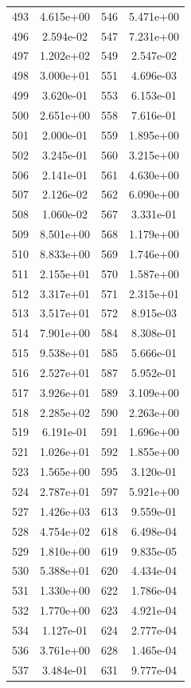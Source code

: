 \documentclass[12pt]{article}
\begin{document}
\begin{longtable}{@{}cccc@{}}
493 & 4.615e+00 & 546 & 5.471e+00 \\
496 & 2.594e-02 & 547 & 7.231e+00 \\
497 & 1.202e+02 & 549 & 2.547e-02 \\
498 & 3.000e+01 & 551 & 4.696e-03 \\
499 & 3.620e-01 & 553 & 6.153e-01 \\
500 & 2.651e+00 & 558 & 7.616e-01 \\
501 & 2.000e-01 & 559 & 1.895e+00 \\
502 & 3.245e-01 & 560 & 3.215e+00 \\
506 & 2.141e-01 & 561 & 4.630e+00 \\
507 & 2.126e-02 & 562 & 6.090e+00 \\
508 & 1.060e-02 & 567 & 3.331e-01 \\
509 & 8.501e+00 & 568 & 1.179e+00 \\
510 & 8.833e+00 & 569 & 1.746e+00 \\
511 & 2.155e+01 & 570 & 1.587e+00 \\
512 & 3.317e+01 & 571 & 2.315e+01 \\
513 & 3.517e+01 & 572 & 8.915e-03 \\
514 & 7.901e+00 & 584 & 8.308e-01 \\
515 & 9.538e+01 & 585 & 5.666e-01 \\
516 & 2.527e+01 & 587 & 5.952e-01 \\
517 & 3.926e+01 & 589 & 3.109e+00 \\
518 & 2.285e+02 & 590 & 2.263e+00 \\
519 & 6.191e-01 & 591 & 1.696e+00 \\
521 & 1.026e+01 & 592 & 1.855e+00 \\
523 & 1.565e+00 & 595 & 3.120e-01 \\
524 & 2.787e+01 & 597 & 5.921e+00 \\
527 & 1.426e+03 & 613 & 9.559e-01 \\
528 & 4.754e+02 & 618 & 6.498e-04 \\
529 & 1.810e+00 & 619 & 9.835e-05 \\
530 & 5.388e+01 & 620 & 4.434e-04 \\
531 & 1.330e+00 & 622 & 1.786e-04 \\
532 & 1.770e+00 & 623 & 4.921e-04 \\
534 & 1.127e-01 & 624 & 2.777e-04 \\
536 & 3.761e+00 & 628 & 1.465e-04 \\
537 & 3.484e-01 & 631 & 9.777e-04 \\

\end{longtable}
\end{document}
